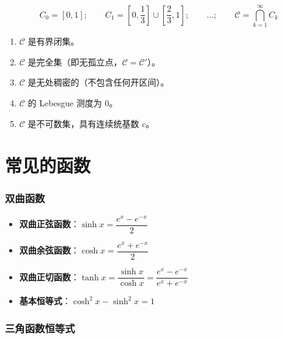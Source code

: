 $$
\displaystyle C_0 = [0, 1];\qquad \displaystyle C_1 = [0, \frac{1}{3}] \cup [\frac{2}{3}, 1];\qquad\displaystyle \dots;\qquad \displaystyle \mathcal{C} = \bigcap_{k=1}^{\infty} C_k
$$

\begin{proposition}

\begin{enumerate}
  \item {$\mathcal{C}$ 是有界闭集。

}\item {$\mathcal{C}$ 是完全集（即无孤立点，$\mathcal{C} = \mathcal{C}'$）。

}\item {$\mathcal{C}$ 是无处稠密的（不包含任何开区间）。

}\item {$\mathcal{C}$ 的 Lebesgue 测度为 $0$。

}\item {$\mathcal{C}$ 是不可数集，具有连续统基数 $c$。

}
\end{enumerate}

\end{proposition}

\section{常见的函数}

\subsubsection{双曲函数}

\begin{itemize}
  \item {\textbf{双曲正弦函数}：$\displaystyle \sinh x = \dfrac{e^x - e^{-x}}{2}$}\item {\textbf{双曲余弦函数}：$\displaystyle \cosh x = \dfrac{e^x + e^{-x}}{2}$}\item {\textbf{双曲正切函数}：$\displaystyle \tanh x = \dfrac{\sinh x}{\cosh x} = \dfrac{e^x - e^{-x}}{e^x + e^{-x}}$}\item {\textbf{基本恒等式}：$\displaystyle \cosh^2 x - \sinh^2 x = 1$}
\end{itemize}

\subsubsection{三角函数恒等式}

